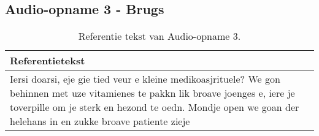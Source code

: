 \subsection{Audio-opname 3 - Brugs}
\begin{table}[htbp]
    \centering
    \label{tab:groundtruth_sample3}
    
    \begin{tabularx}{\textwidth}{|X|}
        \hline
        \textbf{Referentietekst} \\
        
        \hline
        Iersi doarsi, eje gie tied veur e kleine medikoasjrituele? We gon behinnen met uze vitamienes te pakkn lik broave joenges e, iere je toverpille om je sterk en hezond te oedn. Mondje open we goan der helehans in en zukke broave patiente zieje \\
        \hline
    \end{tabularx}
    \caption{Referentie tekst van Audio-opname 3.}
\end{table}

